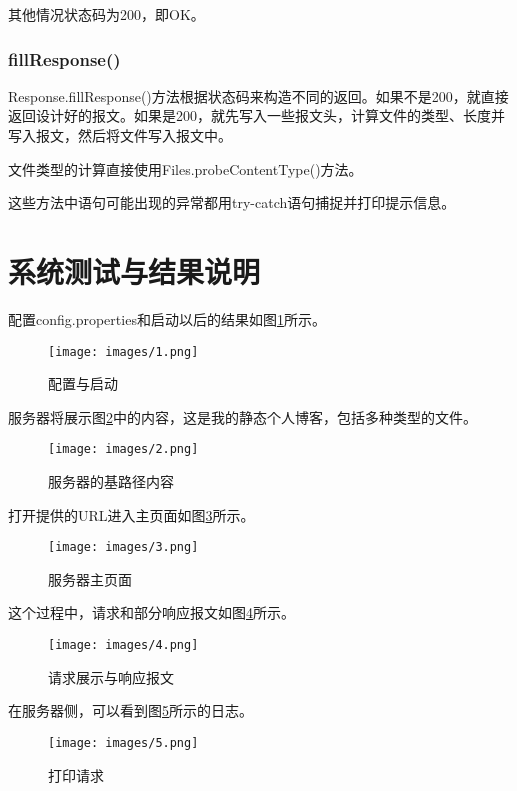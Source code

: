 \documentclass[UTF8,12pt]{ctexart}
\begin{document}
其他情况状态码为200，即OK。

\subsubsection{fillResponse()}

Response.fillResponse()方法根据状态码来构造不同的返回。如果不是200，就直接返回设计好的报文。如果是200，就先写入一些报文头，计算文件的类型、长度并写入报文，然后将文件写入报文中。

文件类型的计算直接使用Files.probeContentType()方法。

\vspace*{2\baselineskip} 

这些方法中语句可能出现的异常都用try-catch语句捕捉并打印提示信息。

\section{系统测试与结果说明}

配置config.properties和启动以后的结果如图\ref{fig2}所示。
\begin{figure}[htbp]
\centering
\texttt{[image: images/1.png]}
\caption{配置与启动}
\label{fig2}
\end{figure}

服务器将展示图\ref{fig3}中的内容，这是我的静态个人博客，包括多种类型的文件。

\begin{figure}[htbp]
	\centering
	\texttt{[image: images/2.png]}
	\caption{服务器的基路径内容}
	\label{fig3}
\end{figure}

打开提供的URL进入主页面如图\ref{fig4}所示。

\begin{figure}[htbp]
	\centering
	\texttt{[image: images/3.png]}
	\caption{服务器主页面}
	\label{fig4}
\end{figure}

这个过程中，请求和部分响应报文如图\ref{fig5}所示。

\begin{figure}[htbp]
	\centering
	\texttt{[image: images/4.png]}
	\caption{请求展示与响应报文}
	\label{fig5}
\end{figure}

在服务器侧，可以看到图\ref{fig6}所示的日志。

\begin{figure}[htbp]
	\centering
	\texttt{[image: images/5.png]}
	\caption{打印请求}
	\label{fig6}
\end{figure}
\end{document}
